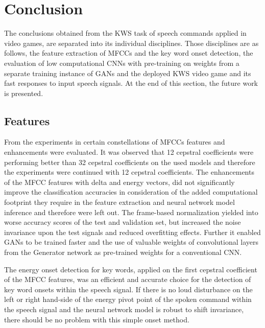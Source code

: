 
\chapter{Conclusion}\label{sec:conclusion}
The conclusions obtained from the KWS task of speech commands applied in video games, are separated into its individual disciplines.
Those disciplines are as follows, the feature extraction of MFCCs and the key word onset detection, the evaluation of low computational CNNs with pre-training on weights from a separate training instance of GANs and the deployed KWS video game and its fast responses to input speech signals.
At the end of this section, the future work is presented.



\section{Features}
\thesisStateReady
From the experiments in  certain constellations of MFCCs features and enhancements were evaluated.
It was observed that 12 cepstral coefficients were performing better than 32 cepstral coefficients on the used models and therefore the experiments were continued with 12 cepstral coefficients.
The enhancements of the MFCC features with delta and energy vectors, did not significantly improve the classification accuracies in consideration of the added computational footprint they require in the feature extraction and neural network model inference and therefore were left out.
The frame-based normalization yielded into worse accuracy scores of the test and validation set, but increased the noise invariance upon the test signals and reduced overfitting effects.
Further it enabled GANs to be trained faster and the use of valuable weights of convolutional layers from the Generator network as pre-trained weights for a conventional CNN.

The energy onset detection for key words, applied on the first cepstral coefficient of the MFCC features, was an efficient and accurate choice for the detection of key word onsets within the speech signal.
If there is no loud disturbance on the left or right hand-side of the energy pivot point of the spoken command within the speech signal and the neural network model is robust to shift invariance, there should be no problem with this simple onset method.



